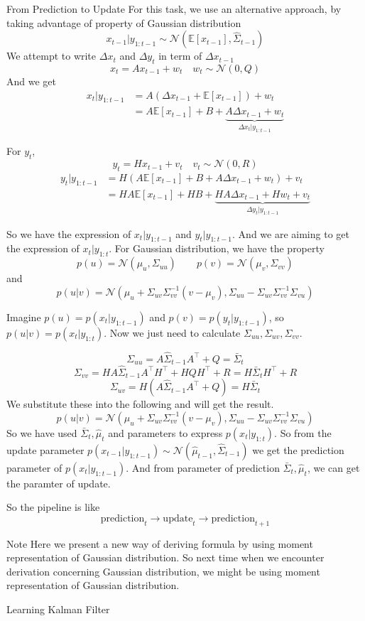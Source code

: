 \documentclass{beamer}
\def\N{\mathcal{N}}
\def\E{\mathbb{E}}
\begin{document}
\begin{frame}[allowframebreaks]{From Prediction to Update}
For this task, we use an alternative approach, by taking advantage of property of Gaussian distribution
$$x_{t-1} | y_{1:t-1} \sim \N(\E[x_{t-1}], \hat{\Sigma}_{t-1})$$
We attempt to write $\Delta x_t$ and $\Delta y_t$ in term of $\Delta x_{t-1}$
$$x_t = Ax_{t-1} + w_t \quad w_t \sim \N(0, Q)$$
And we get 
\begin{align*}
x_t|y_{1:t-1} & = A(\Delta x_{t-1} + \E[x_{t-1}]) + w_t \\
& = A\E[x_{t-1}] + B + \underbrace{A\Delta x_{t-1} + w_t}_{\Delta x_t | y_{1:t-1}}
\end{align*}

\framebreak

For $y_t$,
$$y_t = Hx_{t-1} + v_t \quad v_t \sim \N(0, R)$$
\begin{align*}
y_t|y_{1:t-1} & = H(A\E[x_{t-1}] + B + A\Delta x_{t-1} + w_t) + v_t \\
& = HA\E[x_{t-1}] + HB + \underbrace{HA\Delta x_{t-1} + Hw_t + v_t}_{\Delta y_t | y_{1 : t-1}}
\end{align*}

So we have the expression of $x_t|y_{1:t-1}$ and $ y_t | y_{1 : t-1}$.
And we are aiming to get the expression of $x_t | y_{1:t}$.
For Gaussian distribution, we have the property
$$p(u) = \N(\mu_u, \Sigma_{uu}) \qquad p(v) = \N(\mu_v, \Sigma_{vv})$$
and 
$$p(u | v) = \N(\mu_u + \Sigma_{uv} \Sigma_{vv}^{-1}(v - \mu_v), \Sigma_{uu} - \Sigma_{uv}\Sigma_{vv}^{-1}\Sigma_{vu})$$

\framebreak 
Imagine $p(u) = p(x_t | y_{1 : t-1})$ and $p(v) = p(y_t | y_{1 : t-1})$, so $p(u |v) = p(x_t | y_{1:t})$.
Now we just need to calculate $\Sigma_{uu}, \Sigma_{uv}, \Sigma_{vv}$.

$$\Sigma_{uu} = A \hat{\Sigma}_{t-1} A^\top + Q = \bar{\Sigma}_t$$
$$\Sigma_{vv} = HA \hat{\Sigma}_{t-1}A^\top H^\top + HQ H^\top + R = H \bar{\Sigma}_t H^\top +R$$
$$\Sigma_{uv} = H(A\hat{\Sigma}_{t-1}A^\top + Q) = H\bar{\Sigma}_t$$
We substitute these into the following and will get the result.
$$p(u | v) = \N(\mu_u + \Sigma_{uv} \Sigma_{vv}^{-1}(v - \mu_v), \Sigma_{uu} - \Sigma_{uv}\Sigma_{vv}^{-1}\Sigma_{vu})$$
So we have used $\bar{\Sigma}_t, \hat{\mu}_t$ and parameters to express $p(x_t | y_{1:t})$.
So from the update parameter $p(x_{t-1} | y_{1:t-1}) \sim \N(\hat{\mu}_{t-1}, \hat{\Sigma}_{t-1})$ we get the prediction parameter of $p(x_t | y_{1:t-1})$. And from parameter of prediction $\bar{\Sigma}_t, \hat{\mu}_t$, we can get the paramter of update.

\framebreak 

So the pipeline is like 
$$\text{prediction}_t \longrightarrow \text{update}_t \longrightarrow \text{prediction}_{t+1}$$
\begin{block}{Note}
Here we present a new way of deriving formula by using moment representation of Gaussian distribution. So next time when we encounter derivation concerning Gaussian distribution, we might be using moment representation of Gaussian distribution.
\end{block}

\end{frame}

\begin{frame}[allowframebreaks]{Learning Kalman Filter}


\end{frame}
\end{document}
